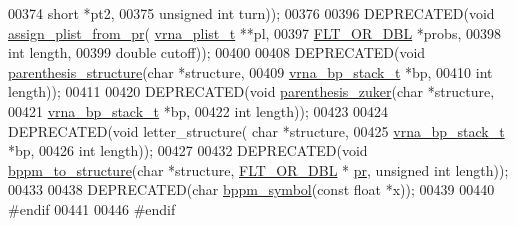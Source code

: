 \begin{DoxyCode}
00374                                       \textcolor{keywordtype}{short} *pt2,
00375                                       \textcolor{keywordtype}{unsigned} \textcolor{keywordtype}{int} turn));
00376 
00396 DEPRECATED(\textcolor{keywordtype}{void}  \hyperlink{group__pf__fold_gacfdacc119b749bccf939de445afea07b}{assign\_plist\_from\_pr}( \hyperlink{group__data__structures_structvrna__plist__s}{vrna\_plist\_t} **pl,
00397                             \hyperlink{group__data__structures_ga31125aeace516926bf7f251f759b6126}{FLT\_OR\_DBL} *probs,
00398                             \textcolor{keywordtype}{int} length,
00399                             \textcolor{keywordtype}{double} cutoff));
00400 
00408 DEPRECATED(\textcolor{keywordtype}{void} \hyperlink{group__struct__utils_gadf0ad2d46c9ca7b850437d1b79627a7e}{parenthesis\_structure}(\textcolor{keywordtype}{char} *structure,
00409                                       \hyperlink{group__data__structures_structvrna__bp__stack__s}{vrna\_bp\_stack\_t} *bp,
00410                                       \textcolor{keywordtype}{int} length));
00411 
00420 DEPRECATED(\textcolor{keywordtype}{void} \hyperlink{group__struct__utils_gab9c5c8311bd5120900585d4fa50c2df0}{parenthesis\_zuker}(\textcolor{keywordtype}{char} *structure,
00421                                   \hyperlink{group__data__structures_structvrna__bp__stack__s}{vrna\_bp\_stack\_t} *bp,
00422                                   \textcolor{keywordtype}{int} length));
00423 
00424 DEPRECATED(\textcolor{keywordtype}{void} letter\_structure( \textcolor{keywordtype}{char} *structure,
00425                                   \hyperlink{group__data__structures_structvrna__bp__stack__s}{vrna\_bp\_stack\_t} *bp,
00426                                   \textcolor{keywordtype}{int} length));
00427 
00432 DEPRECATED(\textcolor{keywordtype}{void}  \hyperlink{group__struct__utils_ga129d81c4a1ead793c5b2311333e03dfa}{bppm\_to\_structure}(\textcolor{keywordtype}{char} *structure, \hyperlink{group__data__structures_ga31125aeace516926bf7f251f759b6126}{FLT\_OR\_DBL} *
      \hyperlink{fold__vars_8h_ac98ec419070aee6831b44e5c700f090f}{pr}, \textcolor{keywordtype}{unsigned} \textcolor{keywordtype}{int} length));
00433 
00438 DEPRECATED(\textcolor{keywordtype}{char}    \hyperlink{group__struct__utils_ga49962ad6242b8c628de6ca16bb831c1d}{bppm\_symbol}(\textcolor{keyword}{const} \textcolor{keywordtype}{float} *x));
00439 
00440 \textcolor{preprocessor}{#endif}
00441 
00446 \textcolor{preprocessor}{#endif}
\end{DoxyCode}
